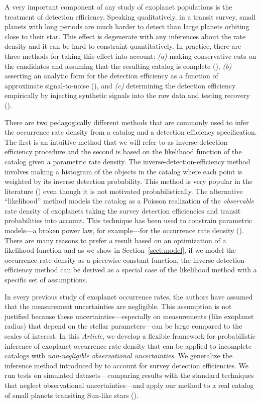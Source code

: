 \documentclass[12pt,preprint]{aastex}
\newcommand{\paper}{\textsl{Article}}
\newcommand{\Sect}[1]{Section~\ref{sect:#1}}
\newcommand{\sect}[1]{\Sect{#1}}
\begin{document}
A very important component of any study of exoplanet populations is the
treatment of detection efficiency.
Speaking qualitatively, in a transit survey, small planets with long periods
are much harder to detect than large planets orbiting close to their star.
This effect is degenerate with any inferences about the rate density and it
can be hard to constraint quantitatively.
In practice, there are three methods for taking this effect into account:
\emph{(a)} making conservative cuts on the candidates and assuming that the
resulting catalog is complete (\citealt{catanzarite, traub, tremaine}),
\emph{(b)} asserting an analytic form for the detection efficiency as a
function of approximate signal-to-noise (\citealt{youdin, howard, dressing,
dong, fressin-fp, morton-swift}), and \emph{(c)} determining the detection
efficiency empirically by injecting synthetic signals into the raw data and
testing recovery (\citealt{petigura-a, petigura}).

There are two pedagogically different methods that are commonly used to infer
the occurrence rate density from a catalog and a detection efficiency
specification.
The first is an intuitive method that we will refer to as
inverse-detection-efficiency procedure and the second is based on the
likelihood function of the catalog given a parametric rate density.
The inverse-detection-efficiency method involves making a histogram of the
objects in the catalog where each point is weighted by its inverse detection
probability.
This method is very popular in the literature (\citealt{howard, dong,
dressing, swift, petigura}) even though it is not motivated probabilistically.
The alternative ``likelihood'' method models the catalog as a Poisson
realization of the \emph{observable} rate density of exoplanets taking the
survey detection efficiencies and transit probabilities into account.
This technique has been used to constrain parametric models---a broken power
law, for example---for the occurrence rate density (\citealt{tabachnik,
youdin, dong}).
There are many reasons to prefer a result based on an optimization of a
likelihood function and as we show in \sect{model}, if we model the occurrence
rate density as a piecewise constant function, the
inverse-detection-efficiency method can be derived as a special case of the
likelihood method with a specific set of assumptions.

In every previous study of exoplanet occurrence rates, the authors have
assumed that the measurement uncertainties are negligible.
This assumption is not justified because these uncertainties---especially on
measurements (like exoplanet radius) that depend on the stellar
parameters---can be large compared to the scales of interest.
In this \paper, we develop a flexible framework for probabilistic inference of
exoplanet occurrence rate density that can be applied to incomplete catalogs
with \emph{non-negligible observational uncertainties}.
We generalize the inference method introduced by \citet{hogge} to account for
survey detection efficiencies.
We run tests on simulated datasets---comparing results with the standard
techniques that neglect observational uncertainties---and apply our method to
a real catalog of small planets transiting Sun-like stars
(\citealt{petigura}).
\end{document}
